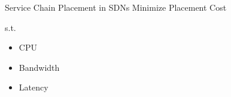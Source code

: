 \begin{frame}{Service Chain Placement in SDNs}
    Minimize Placement Cost

    s.t.
    \begin{itemize}
        \item CPU
        \item Bandwidth
        \item Latency
    \end{itemize}
\end{frame}